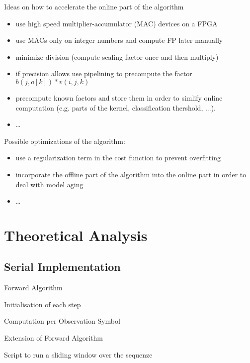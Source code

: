 \documentclass[mscthesis]{usiinfthesis}
\begin{document}
Ideas on how to accelerate the online part of the algorithm
\begin{itemize}
    \item use high speed multiplier-accumulator (MAC) devices on a FPGA
    \item use MACs only on integer numbers and compute FP later manually
    \item minimize division (compute scaling factor once and then multiply)
    \item if precision allows use pipelining to precompute the factor
        $ b(j, o[k]) * v(i, j, k) $
    \item precompute known factors and store them in order to simlify online
        computation (e.g. parts of the kernel, classification thershold, ...).
    \item \dots
\end{itemize}

Possible optimizations of the algorithm:
\begin{itemize}
    \item use a regularization term in the cost function to prevent overfitting
    \item incorporate the offline part of the algorithm into the online part in
        order to deal with model aging
    \item \dots
\end{itemize}

\section{Theoretical Analysis}
\label{ch:acc_theo}

\subsection{Serial Implementation}

Forward Algorithm

Initialisation of each step

Computation per Observation Symbol

Extension of Forward Algorithm

Script to run a sliding window over the sequenze

\end{document}
